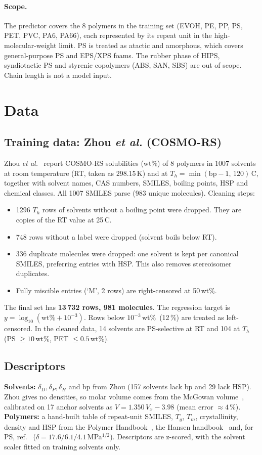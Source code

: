 \documentclass[11pt,a4paper]{article}
\newcommand{\wt}{wt\%}
\begin{document}
\paragraph{Scope.} The predictor covers the 8 polymers in the training set (EVOH, PE, PP, PS, PET, PVC,
PA6, PA66), each represented by its repeat unit in the high-molecular-weight limit. PS is treated as
atactic and amorphous, which covers general-purpose PS and EPS/XPS foams. The rubber phase of HIPS,
syndiotactic PS and styrenic copolymers (ABS, SAN, SBS) are out of scope. Chain length is not a model
input.

\section{Data}
\subsection{Training data: Zhou \emph{et al.} (COSMO-RS)}
Zhou \emph{et al.}~\cite{zhou} report COSMO-RS solubilities (\wt) of 8 polymers in 1007 solvents at room
temperature (RT, taken as 298.15\,K) and at $T_h=\min(\mathrm{bp}-1,\,120)$\,\textdegree C, together with
solvent names, CAS numbers, SMILES, boiling points, HSP and chemical classes. All 1007 SMILES parse
(983 unique molecules). Cleaning steps:
\begin{itemize}
\item 1296 $T_h$ rows of solvents without a boiling point were dropped. They are copies of the RT value
at 25\,\textdegree C.
\item 748 rows without a label were dropped (solvent boils below RT).
\item 336 duplicate molecules were dropped: one solvent is kept per canonical SMILES, preferring entries
with HSP. This also removes stereoisomer duplicates.
\item Fully miscible entries (`M', 2 rows) are right-censored at 50\,\wt.
\end{itemize}
The final set has \textbf{13\,732 rows, 981 molecules}. The regression target is
$y=\log_{10}(\text{\wt}+10^{-3})$. Rows below $10^{-3}$\,\wt\ (12\,\%) are treated as left-censored.
In the cleaned data, 14 solvents are PS-selective at RT and 104 at $T_h$
(PS $\ge 10$\,\wt, PET $\le 0.5$\,\wt).

\subsection{Descriptors}
\textbf{Solvents:} $\delta_D,\delta_P,\delta_H$ and bp from Zhou (157 solvents lack bp and 29 lack HSP).
Zhou gives no densities, so molar volume comes from the McGowan volume~\cite{mcgowan}, calibrated on 17
anchor solvents as $V=1.350\,V_x-3.98$ (mean error $\approx 4$\,\%).
\textbf{Polymers:} a hand-built table of repeat-unit SMILES, $T_g$, $T_m$, crystallinity, density and
HSP from the Polymer Handbook~\cite{polyhb}, the Hansen handbook~\cite{hansen} and, for PS,
ref.~\cite{pshsp} ($\delta = 17.6/6.1/4.1$\,MPa$^{1/2}$). Descriptors are z-scored, with the solvent
scaler fitted on training solvents only.
\end{document}

